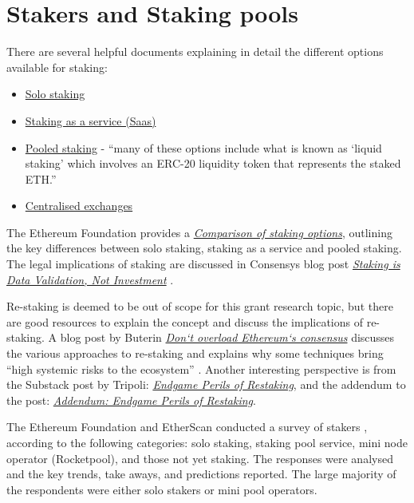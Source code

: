 \documentclass[UTF8]{article}
\begin{document}
\section{Stakers and Staking pools}
\label{sec:stakers}
There are several helpful documents explaining in detail the different options available for staking:
\begin{itemize}
\item \href{https://ethereum.org/en/staking/solo/}{Solo staking} \cite{efsolo}
\item \href{https://ethereum.org/en/staking/saas/}{Staking as a service (Saas)} \cite{efsaas}
\item \href{https://ethereum.org/en/staking/pools/}{Pooled staking} - ``many of these options include what is known as `liquid staking' which involves an ERC-20 liquidity token that represents the staked ETH.'' \cite{efpools} 
\item \href{https://ethereum.org/en/staking/}{Centralised exchanges} \cite{efstaking}
\end{itemize}

The Ethereum Foundation provides a \href{https://ethereum.org/en/staking/#comparison-of-options}{\textit{Comparison of staking options}}, outlining the key differences between solo staking, staking as a service and pooled staking. The legal implications of staking are discussed in Consensys blog post \href{https://consensys.net/blog/news/staking-is-data-validation-not-investment/}{\textit{Staking is Data Validation, Not Investment}} \cite{corva2023}.

Re-staking is deemed to be out of scope for this grant research topic, but there are good resources to explain the concept and discuss the implications of re-staking. A blog post by Buterin \href{https://vitalik.ca/general/2023/05/21/dont\_overload.html}{\textit{Don`t overload Ethereum`s consensus}} discusses the various approaches to re-staking and explains why some techniques bring ``high systemic risks to the ecosystem'' \cite{buterin2023a}. Another interesting perspective is from the Substack post by Tripoli: \href{https://dataalways.substack.com/p/endgame-perils-of-restaking}{\textit{Endgame Perils of Restaking}}, and the addendum to the post: \href{https://dataalways.substack.com/p/addendum-endgame-perils-of-restaking}{\textit{Addendum: Endgame Perils of Restaking}}.

The Ethereum Foundation and EtherScan conducted a survey of stakers \cite{Smith2023}, according to the following categories: solo staking, staking pool service, mini node operator (Rocketpool), and those not yet staking. The responses were analysed and the key trends, take aways, and predictions reported. The large majority of the respondents were either solo stakers or mini pool operators.
\end{document}
